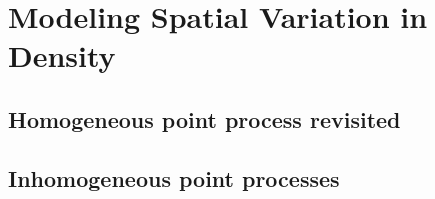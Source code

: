 \chapter{
Modeling Spatial Variation in Density
}
\label{chapt.state-space}


\section{Homogeneous point process revisited}

\begin{figure}
\centering

\label{state-space.fig.homo}
\end{figure}

\begin{comment}
 
\begin{table}
  \centering
 
  \begin{tabular}{lccc}
    \hline
   
    \hline

    \hline
  \end{tabular}
  \label{state-space.tab.homo}
\end{table}
\end{comment}


\section{Inhomogeneous point processes}

\begin{equation}
  \label{state-space.eq.loglin}
\end{equation}

\begin{equation}
\label{state-space.eq.EN}
\end{equation}

\begin{equation}
  \label{state-space.eq.uprior}
\end{equation}

\begin{equation}
\label{state-space.eq.pdf.hetero}
\end{equation}

\begin{equation}
\label{state-space.eq.pdf.hetero.d}
\end{equation}

\begin{equation}
\label{state-space.eq.psimu}
\end{equation}

